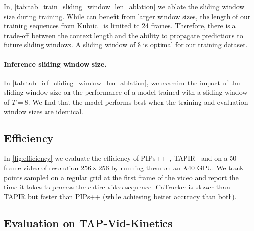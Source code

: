 In, \cref{tab:tab_train_sliding_window_len_ablation} we ablate the sliding window size during training.
While \method can benefit from larger window sizes, the length of our training sequences from Kubric~\cite{tapvid} is limited to 24 frames.
Therefore, there is a trade-off between the context length and the ability to propagate predictions to future sliding windows.
A sliding window of 8 is optimal for our training dataset.


\paragraph{Inference sliding window size.}

In \cref{tab:tab_inf_sliding_window_len_ablation}, we examine the impact of the sliding window size on the performance of a model trained with a sliding window of $T=8$.
We find that the model performs best when the training and evaluation window sizes are identical.

\begin{table}[tb]
    \begin{minipage}{.47\linewidth}
        \centering
        \setlength\tabcolsep{0.9pt}
       
    \end{minipage}%
    \hspace{0.02\linewidth}
    \begin{minipage}{0.5\linewidth}
        \centering
        \setlength\tabcolsep{1pt}
        
    \end{minipage}
\end{table}

\subsection{Efficiency}

In \cref{fig:efficiency} we evaluate the efficiency of PIPs++~\cite{zheng2023pointodyssey}, TAPIR~\cite{doersch2023tapir} and \method on a 50-frame video of resolution $256\times256$ by running them on an A40 GPU\@.
We track points sampled on a regular grid at the first frame of the video and report the time it takes to process the entire video sequence.
CoTracker is slower than TAPIR but faster than PIPs++ (while achieving better accuracy than both).

\subsection{Evaluation on TAP-Vid-Kinetics}

